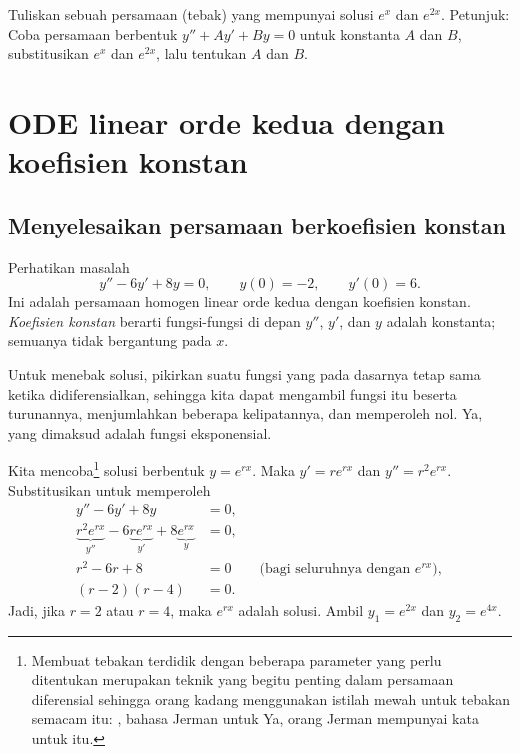 \begin{exercise}
Tuliskan sebuah persamaan (tebak) yang mempunyai solusi $e^x$ dan $e^{2x}$. Petunjuk: Coba persamaan berbentuk $y''+Ay'+By = 0$ untuk konstanta $A$ dan $B$, substitusikan $e^x$ dan $e^{2x}$, lalu tentukan $A$ dan $B$.
\end{exercise}


\sectionnewpage
\section{ODE linear orde kedua dengan koefisien konstan}
\label{sec:ccsol}



\subsection{Menyelesaikan persamaan berkoefisien konstan}

Perhatikan masalah
\begin{equation*}
y''-6y'+8y = 0, \qquad y(0) = - 2, \qquad y'(0) = 6 .
\end{equation*}
Ini adalah persamaan homogen linear orde kedua dengan koefisien konstan. \emph{Koefisien konstan} berarti fungsi-fungsi di depan $y''$, $y'$, dan $y$ adalah konstanta; semuanya tidak bergantung pada $x$.

Untuk menebak solusi, pikirkan suatu fungsi yang pada dasarnya tetap sama ketika didiferensialkan, sehingga kita dapat mengambil fungsi itu beserta turunannya, menjumlahkan beberapa kelipatannya, dan memperoleh nol. Ya, yang dimaksud adalah fungsi eksponensial.

Kita mencoba\footnote{%
Membuat tebakan terdidik dengan beberapa parameter yang perlu ditentukan merupakan teknik yang begitu penting dalam persamaan diferensial sehingga orang kadang menggunakan istilah mewah untuk tebakan semacam itu: \emph{}, bahasa Jerman untuk  Ya, orang Jerman mempunyai kata untuk itu.}
solusi berbentuk $y = e^{rx}$. Maka $y' = r e^{rx}$ dan $y'' = r^2 e^{rx}$. Substitusikan untuk memperoleh
\begin{align*}
y''-6y'+8y & = 0 , \\
\underbrace{r^2 e^{rx}}_{y''} -6 \underbrace{r e^{rx}}_{y'}+8 \underbrace{e^{rx}}_{y} & = 0 , \\
r^2 -6 r +8 & = 0 \qquad \text{(bagi seluruhnya dengan } e^{rx} \text{)},\\
(r-2)(r-4) & = 0 .
\end{align*}
Jadi, jika $r=2$ atau $r=4$, maka $e^{rx}$ adalah solusi. Ambil $y_1 = e^{2x}$ dan $y_2 = e^{4x}$.

